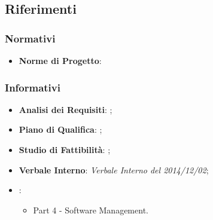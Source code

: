 	\subsection{Riferimenti}
		\subsubsection{Normativi}
			\begin{itemize}
				\item \textbf{Norme di Progetto}: \docNameVersionNdP
			\end{itemize}	
		\subsubsection{Informativi}
			\begin{itemize}
				\item \textbf{Analisi dei Requisiti}: \docNameVersionAdR;
				\item \textbf{Piano di Qualifica}: \docNameVersionPdQ;
				\item \textbf{Studio di Fattibilità}: \docNameVersionSdF;
				\item \textbf{Verbale Interno}: \emph{Verbale Interno del 2014/12/02};
				\item \textbf{\sommerville}:
					\begin{itemize}
						\item Part 4 - Software Management.					
					\end{itemize}
			\end{itemize}
			
